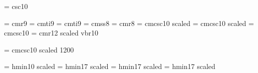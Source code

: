 







\hoffset-4mm
\voffset-13mm



\Internote

\font\caps = \fontid csc10

\font\rmlyrics = cmr9
\font\itlyrics = cmti9
\font\smallit = cmti9
\font\notelett = cmss8
\font\smallrm = cmr8
\font\titelll = cmcsc10 scaled
\font\titell = cmcsc10 scaled
\font\smallcaps = cmcsc10
\font\twelverm = cmr12 scaled
\font\rm vbr10

\rm

\let\textini=\textinitial

\def\textinitial#1#2{\textini#1{\caps#2}}

\def\today{\number\day\space
           \ifcase\month\or
           January\or February\or March\or April\or May\or June\or
           July\or August\or September\or October\or November\or December\fi
           \space \number\year}

\def\loreto#1{{\hskip10mm \itlyrics #1 }}

\def\ngl#1{\cchar{-6}{\itlyrics #1}}
\def\engl#1{\cchar{-7}{\itlyrics #1}}
\def\sengl#1{\cchar{-9}{\itlyrics #1}}
\def\subengl#1{\cchar{-13}{\itlyrics #1}}


\def\bgenerale{\ateverysystem{\znotes\bmolle b\gen}}

\font\biggish = cmcsc10 scaled 1200

\font\bigtype = hmin10 scaled 
\font\Bigtype = hmin17 scaled 
\font\musicaps = hmin17 scaled 
\font\textcaps = hmin17 scaled 

\def\section#1{{\medskip \biggish #1 \smallskip}}
\def\subsection*#1{{\medskip \biggish #1 \smallskip}}

